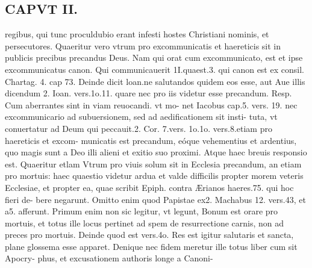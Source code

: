 \documentclass{article}
\begin{document}
\begin{pages}
\section*{CAPVT  II. }
\marginpar{[ p.45 ]}\pstart regibus, qui tunc proculdubio erant infesti hostes Christiani nominis, et persecutores. Quaeritur vero vtrum pro excommunicatis et haereticis sit in publicis precibus precandus Deus. Nam qui orat cum excommunicato, est et ipse excommunicatus canon. Qui communicauerit 1I.quaest.3. qui canon est ex consil. Chartag. 4. cap 73. Deinde dicit loan.ne salutandos quidem eos esse, aut Aue illis dicendum 2. Ioan. vers.1o.11. quare nec pro iis videtur esse precandum. Resp. Cum aberrantes sint in viam reuocandi. vt mo- net Iacobus cap.5. vers. 19. nec excommunicario ad subuersionem, sed ad aedificationem sit insti- tuta, vt conuertatur ad Deum qui peccauit.2. Cor. 7.vers. 1o.1o. vers.8.etiam pro haereticis et excom- municatis est precandum, eóque vehementius et ardentius, quo magis sunt a Deo illi alieni et exitio suo proximi. Atque haec breuis responsio est. Quaeritur etlam Vtrum pro viuis solum sit in Ecclesia precandum, an etiam pro mortuis: haec quaestio videtur ardua et valde difficilis propter morem veteris Ecclesiae, et propter ea, quae scribit Epiph. contra Ærianos haeres.75. qui hoc fieri de- bere negarunt. Omitto enim quod Papistae ex2. Machabus  12. vers.43, et a5. afferunt. Primum enim non sic legitur, vt legunt, Bonum est orare pro mortuis, et totus ille locus pertinet ad spem de resurrectione carnis, non ad preces pro mortuis. Deinde quod est vers.4o. Res est igitur salutaris et sancta, plane glossema esse apparet. Denique nec fidem meretur ille totus liber cum sit Apocry- phus, et excusationem authoris longe a Canoni-  \pend

\end{pages}
\end{document}
